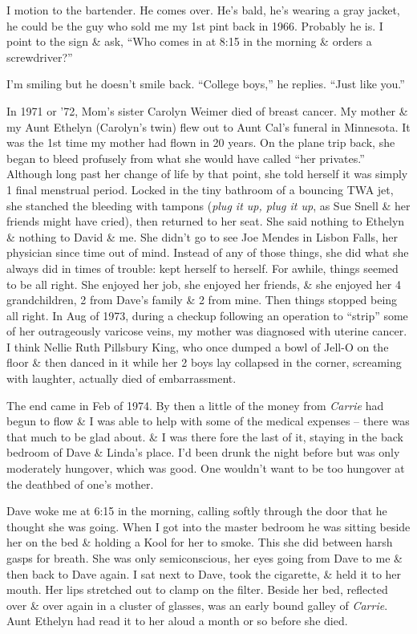 \documentclass{article}
\numberwithin{equation}{section}
\begin{document}
I motion to the bartender. He comes over. He's bald, he's wearing a gray jacket, he could be the guy who sold me my 1st pint back in 1966. Probably he is. I point to the sign \& ask, ``Who comes in at 8:15 in the morning \& orders a screwdriver?''

I'm smiling but he doesn't smile back. ``College boys,'' he replies. ``Just like you.''

 In 1971 or '72, Mom's sister Carolyn Weimer died of breast cancer. My mother \& my Aunt Ethelyn (Carolyn's twin) flew out to Aunt Cal's funeral in Minnesota. It was the 1st time my mother had flown in 20 years. On the plane trip back, she began to bleed profusely from what she would have called ``her privates.'' Although long past her change of life by that point, she told herself it was simply 1 final menstrual period. Locked in the tiny bathroom of a bouncing TWA jet, she stanched the bleeding with tampons (\textit{plug it up, plug it up}, as Sue Snell \& her friends might have cried), then returned to her seat. She said nothing to Ethelyn \& nothing to David \& me. She didn't go to see Joe Mendes in Lisbon Falls, her physician since time out of mind. Instead of any of those things, she did what she always did in times of trouble: kept herself to herself. For awhile, things seemed to be all right. She enjoyed her job, she enjoyed her friends, \& she enjoyed her 4 grandchildren, 2 from Dave's family \& 2 from mine. Then things stopped being all right. In Aug of 1973, during a checkup following an operation to ``strip'' some of her outrageously varicose veins, my mother was diagnosed with uterine cancer. I think Nellie Ruth Pillsbury King, who once dumped a bowl of Jell-O on the floor \& then danced in it while her 2 boys lay collapsed in the corner, screaming with laughter, actually died of embarrassment.

The end came in Feb of 1974. By then a little of the money from \textit{Carrie} had begun to flow \& I was able to help with some of the medical expenses -- there was that much to be glad about. \& I was there fore the last of it, staying in the back bedroom of Dave \& Linda's place. I'd been drunk the night before but was only moderately hungover, which was good. One wouldn't want to be too hungover at the deathbed of one's mother.

Dave woke me at 6:15 in the morning, calling softly through the door that he thought she was going. When I got into the master bedroom he was sitting beside her on the bed \& holding a Kool for her to smoke. This she did between harsh gasps for breath. She was only semiconscious, her eyes going from Dave to me \& then back to Dave again. I sat next to Dave, took the cigarette, \& held it to her mouth. Her lips stretched out to clamp on the filter. Beside her bed, reflected over \& over again in a cluster of glasses, was an early bound galley of \textit{Carrie}. Aunt Ethelyn had read it to her aloud a month or so before she died.
\end{document}
